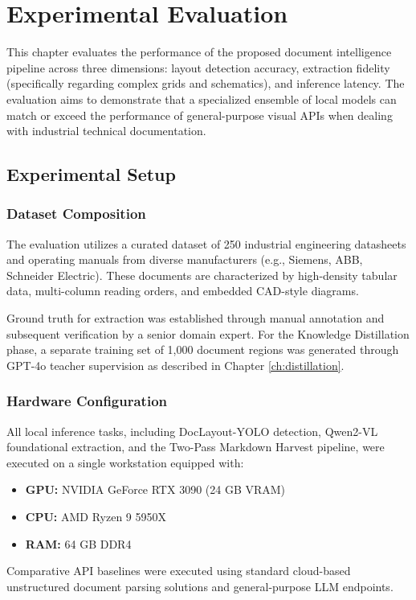 \chapter{Experimental Evaluation}
\label{ch:evaluation}

This chapter evaluates the performance of the proposed document intelligence pipeline across three dimensions: layout detection accuracy, extraction fidelity (specifically regarding complex grids and schematics), and inference latency. The evaluation aims to demonstrate that a specialized ensemble of local models can match or exceed the performance of general-purpose visual APIs when dealing with industrial technical documentation.

\section{Experimental Setup}
\label{sec:experimental_setup}

\subsection{Dataset Composition}
The evaluation utilizes a curated dataset of 250 industrial engineering datasheets and operating manuals from diverse manufacturers (e.g., Siemens, ABB, Schneider Electric). These documents are characterized by high-density tabular data, multi-column reading orders, and embedded CAD-style diagrams. 

Ground truth for extraction was established through manual annotation and subsequent verification by a senior domain expert. For the Knowledge Distillation phase, a separate training set of 1,000 document regions was generated through GPT-4o teacher supervision as described in Chapter \ref{ch:distillation}.

\subsection{Hardware Configuration}
All local inference tasks, including DocLayout-YOLO \citep{doclayout_yolo} detection, Qwen2-VL \citep{qwen25} foundational extraction, and the Two-Pass Markdown Harvest pipeline, were executed on a single workstation equipped with:
\begin{itemize}
    \item \textbf{GPU:} NVIDIA GeForce RTX 3090 (24 GB VRAM)
    \item \textbf{CPU:} AMD Ryzen 9 5950X
    \item \textbf{RAM:} 64 GB DDR4
\end{itemize}
Comparative API baselines were executed using standard cloud-based unstructured document parsing solutions and general-purpose LLM endpoints.

